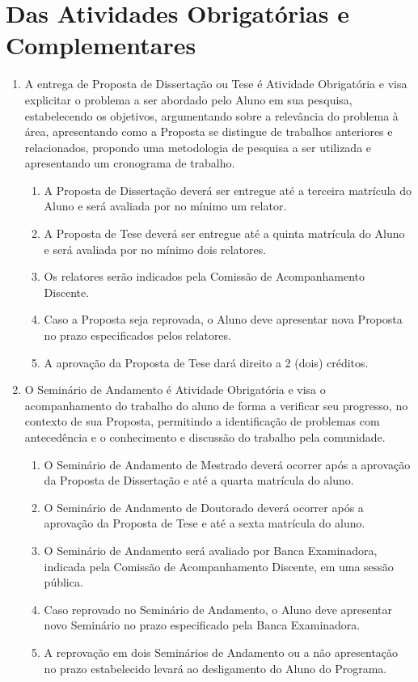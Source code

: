 \documentclass{article}
\begin{document}
\section{Das Atividades Obrigatórias e Complementares}
\label{atividades}
\begin{enumerate}

	\item  A entrega de Proposta de Dissertação ou Tese é Atividade Obrigatória e visa explicitar o problema a ser abordado pelo Aluno em sua pesquisa, estabelecendo os objetivos, argumentando sobre a relevância do problema à área, apresentando como a Proposta se distingue de trabalhos anteriores e relacionados, propondo uma metodologia de pesquisa a ser utilizada e apresentando um cronograma de trabalho.
	\begin{enumerate}
		\item A Proposta de Dissertação deverá ser entregue até a terceira matrícula do Aluno e será avaliada por no mínimo um relator.
		\item A Proposta de Tese deverá ser entregue até a quinta matrícula do Aluno e será avaliada por no mínimo dois relatores.
		\item Os relatores serão indicados pela Comissão de Acompanhamento Discente.
		\item Caso a Proposta seja reprovada, o Aluno deve apresentar nova Proposta no prazo especificados pelos relatores.
		\item A aprovação da Proposta de Tese dará direito a 2 (dois) créditos.
	\end{enumerate}

	\item O Seminário de Andamento é Atividade Obrigatória e visa o acompanhamento do trabalho do aluno de forma a verificar seu progresso, no contexto de sua Proposta, permitindo a identificação de problemas com antecedência e o conhecimento e discussão do trabalho pela comunidade.
	\begin{enumerate}
		\item O Seminário de Andamento de Mestrado deverá ocorrer após a aprovação da Proposta de Dissertação e até a quarta matrícula do aluno.
		\item O Seminário de Andamento de Doutorado deverá ocorrer após a aprovação da Proposta de Tese e até a sexta matrícula do aluno.
		\item O Seminário de Andamento será avaliado por Banca Examinadora, indicada pela Comissão de Acompanhamento Discente, em uma sessão pública.
		\item Caso reprovado no Seminário de Andamento, o Aluno deve apresentar novo Seminário no prazo especificado pela Banca Examinadora.
		\item A reprovação em dois Seminários de Andamento ou a não apresentação no prazo estabelecido levará ao desligamento do Aluno do Programa.
	\end{enumerate}


\end{enumerate}
\end{document}
